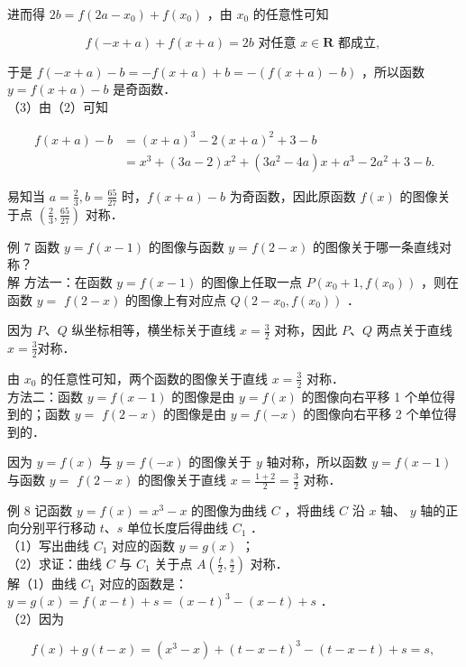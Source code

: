 \documentclass[10pt]{article}
\begin{document}
进而得 \(2 b=f\left(2 a-x_{0}\right)+f\left(x_{0}\right)\) ，由 \(x_{0}\) 的任意性可知

\[
f(-x+a)+f(x+a)=2 b \text { 对任意 } x \in \mathbf{R} \text { 都成立, }
\]

于是 \(f(-x+a)-b=-f(x+a)+b=-(f(x+a)-b)\) ，所以函数 \(y=f(x+a)-b\) 是奇函数．\\
（3）由（2）可知

\[
\begin{aligned}
f(x+a)-b & =(x+a)^{3}-2(x+a)^{2}+3-b \\
& =x^{3}+(3 a-2) x^{2}+\left(3 a^{2}-4 a\right) x+a^{3}-2 a^{2}+3-b .
\end{aligned}
\]

易知当 \(a=\frac{2}{3}, b=\frac{65}{27}\) 时，\(f(x+a)-b\) 为奇函数，因此原函数 \(f(x)\) 的图像关于点 \(\left(\frac{2}{3}, \frac{65}{27}\right)\) 对称．

例 7 函数 \(y=f(x-1)\) 的图像与函数 \(y=f(2-x)\) 的图像关于哪一条直线对称？\\
解 方法一：在函数 \(y=f(x-1)\) 的图像上任取一点 \(P\left(x_{0}+1, f\left(x_{0}\right)\right)\) ，则在函数 \(y=\) \(f(2-x)\) 的图像上有对应点 \(Q\left(2-x_{0}, f\left(x_{0}\right)\right)\) ．

因为 \(P 、 Q\) 纵坐标相等，横坐标关于直线 \(x=\frac{3}{2}\) 对称，因此 \(P 、 Q\) 两点关于直线 \(x=\frac{3}{2}\)对称．

由 \(x_{0}\) 的任意性可知，两个函数的图像关于直线 \(x=\frac{3}{2}\) 对称．\\
方法二：函数 \(y=f(x-1)\) 的图像是由 \(y=f(x)\) 的图像向右平移 1 个单位得到的；函数 \(y=\) \(f(2-x)\) 的图像是由 \(y=f(-x)\) 的图像向右平移 2 个单位得到的．

因为 \(y=f(x)\) 与 \(y=f(-x)\) 的图像关于 \(y\) 轴对称，所以函数 \(y=f(x-1)\) 与函数 \(y=\) \(f(2-x)\) 的图像关于直线 \(x=\frac{1+2}{2}=\frac{3}{2}\) 对称．

例 8 记函数 \(y=f(x)=x^{3}-x\) 的图像为曲线 \(C\) ，将曲线 \(C\) 沿 \(x\) 轴、 \(y\) 轴的正向分别平行移动 \(t 、 s\) 单位长度后得曲线 \(C_{1}\) ．\\
（1）写出曲线 \(C_{1}\) 对应的函数 \(y=g(x)\) ；\\
（2）求证：曲线 \(C\) 与 \(C_{1}\) 关于点 \(A\left(\frac{t}{2}, \frac{s}{2}\right)\) 对称．\\
解（1）曲线 \(C_{1}\) 对应的函数是：\(y=g(x)=f(x-t)+s=(x-t)^{3}-(x-t)+s\) ．\\
（2）因为

\[
f(x)+g(t-x)=\left(x^{3}-x\right)+(t-x-t)^{3}-(t-x-t)+s=s \text {, }
\]
\end{document}
